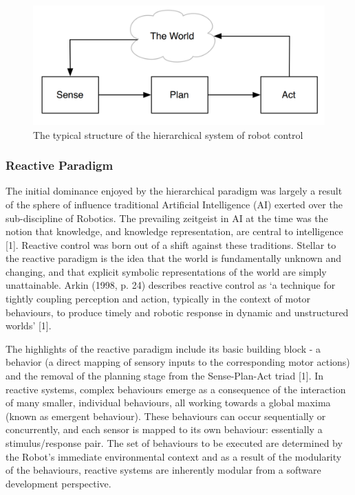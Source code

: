\documentclass{article}
\begin{document}
	\begin{figure}[h!]
	\centering
	\includegraphics[width=0.8\linewidth]{LiteratureReview2}
	\caption{The typical structure of the hierarchical system of robot control}
	\end{figure}
	
	\subsubsection{Reactive Paradigm}
	The initial dominance enjoyed by the hierarchical paradigm was largely a result of the sphere of influence traditional Artificial Intelligence (AI) exerted over the sub-discipline of Robotics. The prevailing zeitgeist in AI at the time was the notion that knowledge, and knowledge representation, are central to intelligence [1]. Reactive control was born out of a shift against these traditions. Stellar to the reactive paradigm is the idea that the world is fundamentally unknown and changing, and that explicit symbolic representations of the world are simply unattainable. Arkin (1998, p. 24) describes reactive control as ‘a technique for tightly coupling perception and action, typically in the context of motor behaviours, to produce timely and robotic response in dynamic and unstructured worlds’ [1].

The highlights of the reactive paradigm include its basic building block - a behavior (a direct mapping of sensory inputs to the corresponding motor actions) and the removal of the planning stage from the Sense-Plan-Act triad [1]. In reactive systems, complex behaviours emerge as a consequence of the interaction of many smaller, individual behaviours, all working towards a global maxima (known as emergent behaviour). These behaviours can occur sequentially or concurrently, and each sensor is mapped to its own behaviour: essentially a stimulus/response pair. The set of behaviours to be executed are determined by the Robot’s immediate environmental context and as a result of the modularity of the behaviours, reactive systems are inherently modular from a software development perspective.
\end{document}
